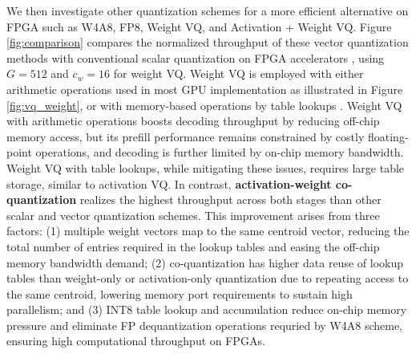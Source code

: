 \documentclass[conference]{IEEEtran}
\begin{document}
We then investigate other quantization schemes for a more efficient alternative on FPGA such as W4A8, FP8, Weight VQ, and Activation + Weight VQ. Figure \ref{fig:comparison} compares the normalized throughput of these vector quantization methods with conventional scalar quantization on FPGA accelerators \cite{hong2022dfx, he2025intar, chen2024allo}, using $G=512$ and $c_w=16$ for weight VQ. Weight VQ is employed with either arithmetic operations used in most GPU implementation as illustrated in Figure \ref{fig:vq_weight}, or with memory-based operations by table lookups \cite{gerlinghoff2024table}. Weight VQ with arithmetic operations boosts decoding throughput by reducing off-chip memory access, but its prefill performance remains constrained by costly floating-point operations, and decoding is further limited by on-chip memory bandwidth. Weight VQ with table lookups, while mitigating these issues, requires large table storage, similar to activation VQ. In contrast, \textbf{activation-weight co-quantization} realizes the highest throughput across both stages than other scalar and vector quantization schemes. This improvement arises from three factors: (1) multiple weight vectors map to the same centroid vector, reducing the total number of entries required in the lookup tables and easing the off-chip memory bandwidth demand; (2) co-quantization has higher data reuse of lookup tables than weight-only or activation-only quantization due to repeating access to the same centroid, lowering memory port requirements to sustain high parallelism; and (3) INT8 table lookup and accumulation reduce on-chip memory pressure and eliminate FP dequantization operations requried by W4A8 scheme, ensuring high computational throughput on FPGAs.



\end{document}
